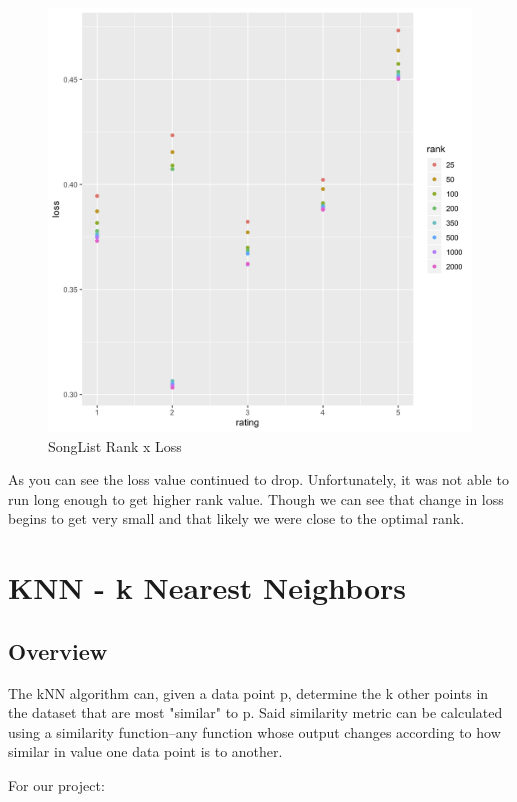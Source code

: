 \documentclass{article}
\begin{document}
\begin{figure}[ht]
\centering
\includegraphics[scale=0.3]{FinalNMFSong.png}
\caption{SongList Rank x Loss}
\label{fig:universe}
\end{figure}

As you can see the loss value continued to drop. Unfortunately, it was not able to run long enough to get higher rank value. Though we can see that change in loss begins to get very small and that likely we were close to the optimal rank.

\section{KNN - k Nearest Neighbors}

\subsection{Overview}

The kNN algorithm can, given a data point p, determine the k other points in the dataset that are most "similar" to p. Said similarity metric can be calculated using a similarity function--any function whose output changes according to how similar in value one data point is to another.

For our project:
\end{document}
